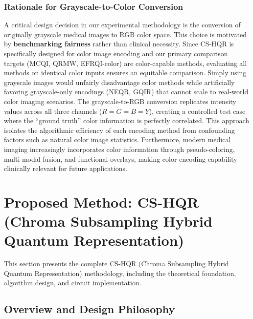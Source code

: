 \documentclass[11pt,a4paper]{article}
\begin{document}
\subsubsection{Rationale for Grayscale-to-Color Conversion}

A critical design decision in our experimental methodology is the conversion of originally grayscale medical images to RGB color space. This choice is motivated by \textbf{benchmarking fairness} rather than clinical necessity. Since CS-HQR is specifically designed for color image encoding and our primary comparison targets (MCQI, QRMW, EFRQI-color) are color-capable methods, evaluating all methods on identical color inputs ensures an equitable comparison. Simply using grayscale images would unfairly disadvantage color methods while artificially favoring grayscale-only encodings (NEQR, GQIR) that cannot scale to real-world color imaging scenarios. The grayscale-to-RGB conversion replicates intensity values across all three channels ($R = G = B = Y$), creating a controlled test case where the ``ground truth'' color information is perfectly correlated. This approach isolates the algorithmic efficiency of each encoding method from confounding factors such as natural color image statistics. Furthermore, modern medical imaging increasingly incorporates color information through pseudo-coloring, multi-modal fusion, and functional overlays, making color encoding capability clinically relevant for future applications.

\vspace{1em}

\section{Proposed Method: CS-HQR (Chroma Subsampling Hybrid Quantum Representation)}
\label{sec:proposed_method}

This section presents the complete CS-HQR (Chroma Subsampling Hybrid Quantum Representation) methodology, including the theoretical foundation, algorithm design, and circuit implementation.

\subsection{Overview and Design Philosophy}
\label{subsec:overview}
\end{document}
